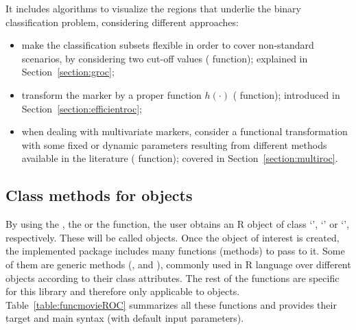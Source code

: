 It includes algorithms to visualize the regions that underlie the binary classification problem, considering different approaches:
\begin{itemize}
\item make the classification subsets flexible in order to cover non-standard scenarios, by considering two cut-off values ( function); explained in Section~\ref{section:groc};
\item transform the marker by a proper function $h(\cdot)$ ( function); introduced in Section~\ref{section:efficientroc};
\item when dealing with multivariate markers, consider a functional transformation with some fixed or dynamic parameters resulting from different methods available in the literature ( function); covered in Section~\ref{section:multiroc}.
\end{itemize}





\subsection{Class methods for  objects} \label{subsec:functions}

By using the , the  or the  function, the user obtains an R object of class `', `' or `', respectively. These will be called  objects. Once the object of interest is created, the implemented package includes many functions (methods) to pass to it. Some of them are generic methods (,  and ), commonly used in R language over different objects according to their class attributes. The rest of the functions are specific for this library and therefore only applicable to  objects. Table~\ref{table:funcmovieROC} summarizes all these functions and provides their target and main syntax (with default input parameters).

